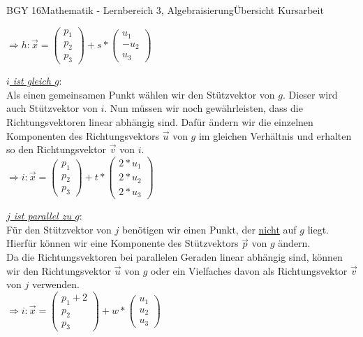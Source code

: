\documentclass[oneside,openany,headings=optiontotoc,11pt,numbers=noenddot]{scrreprt}
\begin{document}
\begin{worksheet}{BGY 16}{Mathematik - Lernbereich 3, Algebraisierung}{Übersicht Kursarbeit}
\begin{framed}
			\(\Rightarrow h: \vec{x} = \left(\begin{array}{c}p_1\\p_2\\p_3\end{array}\right) + s*\left(\begin{array}{c}u_1\\-u_2\\u_3\end{array}\right)\)\\
			\par\bigskip\noindent
			\underline{\textit{\(i\) ist \color{codegreen}gleich\normalcolor{} \(g\)}}:\\
			Als einen gemeinsamen Punkt wählen wir den Stützvektor von \(g\). Dieser wird auch Stützvektor von \(i\). Nun müssen wir noch gewährleisten, dass die Richtungsvektoren linear \color{blue}abhängig\normalcolor{} sind. Dafür ändern wir die einzelnen Komponenten des Richtungsvektors \(\vec{u}\) von \(g\) im gleichen Verhältnis und erhalten so den Richtungsvektor \(\vec{v}\) von \(i\).\\
			\(\Rightarrow i: \vec{x} = \left(\begin{array}{c}p_1\\p_2\\p_3\end{array}\right) + t*\left(\begin{array}{c}2*u_1\\2*u_2\\2*u_3\end{array}\right)\)\\
			\par\bigskip\noindent
			\underline{\textit{\(j\) ist \color{red}parallel\normalcolor{} zu \(g\)}}:\\
			Für den Stützvektor von \(j\) benötigen wir einen Punkt, der \underline{nicht} auf \(g\) liegt. Hierfür können wir eine Komponente des Stützvektors \(\vec{p}\) von \(g\) ändern.\\ Da die Richtungsvektoren bei \color{red}parallelen\normalcolor{} Geraden linear \color{blue}abhängig\normalcolor{} sind, können wir den Richtungsvektor \(\vec{u}\) von \(g\) oder ein Vielfaches davon als Richtungsvektor \(\vec{v}\) von \(j\) verwenden.\\
			\(\Rightarrow i: \vec{x} = \left(\begin{array}{c}p_1+2\\p_2\\p_3\end{array}\right) + w*\left(\begin{array}{c}u_1\\u_2\\u_3\end{array}\right)\)\\

\end{framed}
\end{worksheet}
\end{document}
